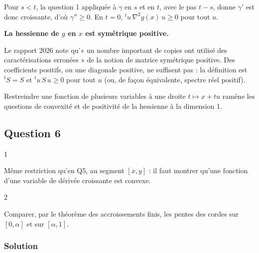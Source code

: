 \documentclass[11pt,a4paper]{article}
\newcommand{\equationajustee}[1]{%
  \sbox{\boiteequation}{$\displaystyle #1$}%
  \ifdim\wd\boiteequation>\linewidth
    \[\resizebox{\linewidth}{!}{\usebox{\boiteequation}}\]%
  \else
    \[#1\]%
  \fi}
\begin{document}
Pour \(s<t\), la question 1 appliquée à \(\gamma\) en \(s\) et en \(t\), avec le pas \(t-s\), donne
\equationajustee{\gamma'(s)\leqslant\frac{\gamma(t)-\gamma(s)}{t-s}\leqslant\gamma'(t).}
\(\gamma'\) est donc croissante, d'où \(\gamma''\geqslant0\). En \(t=0\), \({}^tu\,\nabla^2g(x)\,u\geqslant0\) pour tout \(u\).

\textbf{La hessienne de \(g\) en \(x\) est symétrique positive.}

\begin{piege}

Le rapport 2026 note qu'« un nombre important de copies ont utilisé des caractérisations erronées » de la notion de matrice symétrique positive. Des coefficients positifs, ou une diagonale positive, ne suffisent pas : la définition est \({}^tS=S\) et \({}^tu\,S\,u\geqslant0\) pour tout \(u\) (ou, de façon équivalente, spectre réel positif).

\end{piege}

\begin{methode}

Restreindre une fonction de plusieurs variables à une droite \(t\mapsto x+tu\) ramène les questions de convexité et de positivité de la hessienne à la dimension 1.

\end{methode}

\hypertarget{question-6}{%
\subsection{Question 6}\label{question-6}}

\begin{indication}{1}

Même restriction qu'en Q5, au segment \([x,y]\) : il faut montrer qu'une fonction d'une variable de dérivée croissante est convexe.

\end{indication}

\begin{indication}{2}

Comparer, par le théorème des accroissements finis, les pentes des cordes sur \([0,\alpha]\) et sur \([\alpha,1]\).

\end{indication}

\hypertarget{solution-5}{%
\subsubsection{Solution}\label{solution-5}}
\end{document}
